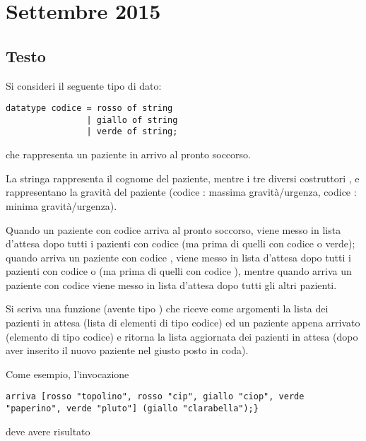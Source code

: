 \section{Settembre 2015}

\subsection{Testo}

Si consideri il seguente tipo di dato:

\begin{lstlisting}[style = SML, nolol = true, caption = {Definizione del tipo di dato \sml{codice}}]
datatype codice = rosso of string
				| giallo of string
				| verde of string;
\end{lstlisting}

che rappresenta un paziente in arrivo al pronto soccorso.

\medskip
La stringa rappresenta il cognome del paziente, mentre i tre diversi costruttori ,  e  rappresentano la gravità del paziente (codice : massima gravità/urgenza, codice : minima gravità/urgenza).

\medskip
Quando un paziente con codice  arriva al pronto soccorso, viene messo in lista d'attesa dopo tutti i pazienti con codice  (ma prima di quelli con codice  o verde); quando arriva un paziente con codice , viene messo in lista d'attesa dopo tutti i pazienti con codice  o  (ma prima di quelli con codice ), mentre quando arriva un paziente con codice  viene messo in lista d'attesa dopo tutti gli altri pazienti.

\medskip
Si scriva una funzione  (avente tipo ) che riceve come argomenti la lista dei pazienti in attesa (lista di elementi di tipo codice) ed un paziente appena arrivato (elemento di tipo codice) e ritorna la lista aggiornata dei pazienti in attesa (dopo aver inserito il nuovo paziente nel giusto posto in coda).

\medskip
Come esempio, l'invocazione

\begin{lstlisting}
arriva [rosso "topolino", rosso "cip", giallo "ciop", verde "paperino", verde "pluto"] (giallo "clarabella");}
\end{lstlisting}

deve avere risultato


